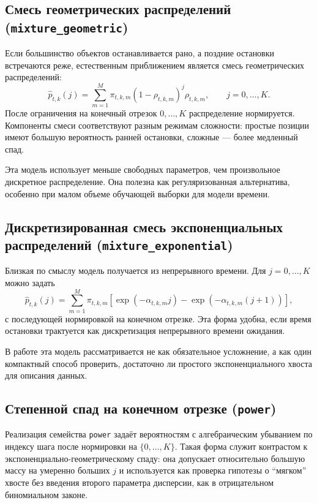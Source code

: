 \subsection{Смесь геометрических распределений (\texttt{mixture\_geometric})}

Если большинство объектов останавливается рано, а поздние остановки встречаются реже, естественным
приближением является смесь геометрических распределений:
\begin{equation}
  \widehat p_{t,k}(j)=\sum_{m=1}^{M}\pi_{t,k,m}(1-\rho_{t,k,m})^j\rho_{t,k,m},
  \qquad j=0,\ldots,K.
  \label{eq:geometric_mixture}
\end{equation}
После ограничения на конечный отрезок \(0,\ldots,K\) распределение нормируется. Компоненты смеси
соответствуют разным режимам сложности: простые позиции имеют большую вероятность ранней
остановки, сложные --- более медленный спад.

Эта модель использует меньше свободных параметров, чем произвольное дискретное распределение. Она
полезна как регуляризованная альтернатива, особенно при малом объеме обучающей выборки для модели
времени.

\subsection{Дискретизированная смесь экспоненциальных распределений (\texttt{mixture\_exponential})}

Близкая по смыслу модель получается из непрерывного времени. Для \(j=0,\ldots,K\) можно задать
\begin{equation}
  \widehat p_{t,k}(j)=\sum_{m=1}^{M}\pi_{t,k,m}
  \left[\exp(-\alpha_{t,k,m}j)-\exp(-\alpha_{t,k,m}(j+1))\right],
  \label{eq:exponential_mixture}
\end{equation}
с последующей нормировкой на конечном отрезке. Эта форма удобна, если время остановки трактуется
как дискретизация непрерывного времени ожидания.

В работе эта модель рассматривается не как обязательное усложнение, а как один компактный способ
проверить, достаточно ли простого экспоненциального хвоста для описания данных.

\subsection{Степенной спад на конечном отрезке (\texttt{power})}

Реализация семейства \texttt{power} задаёт вероятностям с алгебраическим
убыванием по индексу шага после нормировки на \(\{0,\ldots,K\}\). Такая форма служит контрастом к
экспоненциально-геометрическому спаду: она допускает относительно большую массу на умеренно
больших \(j\) и используется как проверка гипотезы о ``мягком'' хвосте без введения второго
параметра дисперсии, как в отрицательном биномиальном законе.


